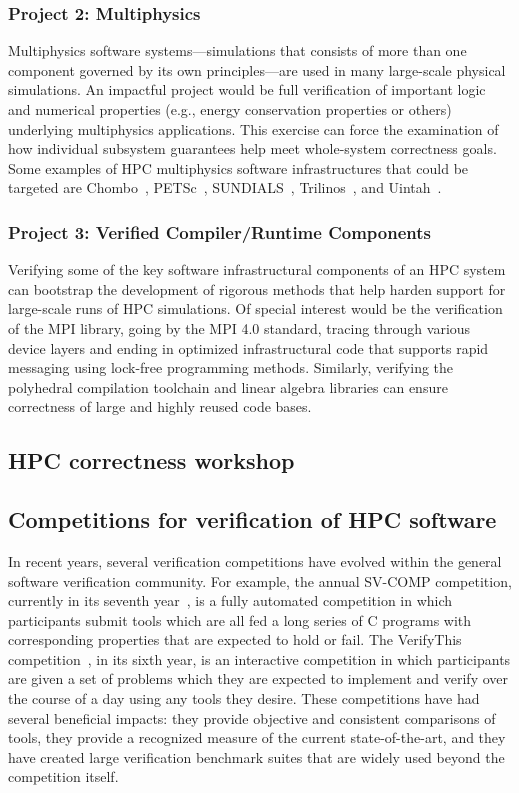 \subsubsection{Project 2: Multiphysics}
Multiphysics software systems---simulations that consists of more than
one component governed by its own principles---are used in many large-scale physical simulations.
%
An impactful project would be full verification of important logic and numerical properties (e.g., energy conservation properties or others) underlying multiphysics applications.
%
This exercise can force the examination of how individual subsystem guarantees help meet whole-system correctness goals.
%
Some examples of HPC multiphysics software infrastructures that could be targeted are Chombo~\cite{Chombo}, PETSc~\cite{PETSc}, SUNDIALS~\cite{SUNDIALS}, Trilinos~\cite{Trilinos}, and Uintah~\cite{Uintah}.

\subsubsection{Project 3: Verified Compiler/Runtime Components}
Verifying some of the key software infrastructural components of an HPC system can bootstrap the development of rigorous methods that help harden support for large-scale runs of HPC simulations.
%
Of special interest would be the verification of the MPI library, going by the MPI 4.0 standard, tracing through various device layers and ending in optimized infrastructural code that supports rapid messaging using lock-free programming methods.
%
Similarly, verifying the polyhedral compilation toolchain and linear algebra libraries can ensure correctness of large and highly reused code bases.


\subsection{HPC correctness workshop}


\subsection{Competitions for verification of HPC software}

In recent years, several verification competitions have evolved within the general software verification community.
For example, the annual SV-COMP competition, currently in its seventh year~\cite{sv-comp}, is a fully automated competition in which participants submit tools which are all fed a long series of C programs with corresponding properties that are expected to hold or fail.  The VerifyThis competition~\cite{verify-this}, in its sixth year, is an interactive competition in which participants are given a set of problems which they are expected to implement and verify over the course of a day using any tools they desire.
These competitions have had several beneficial impacts: they provide objective and consistent comparisons of tools, they provide a recognized measure of the current state-of-the-art, and they have created large verification benchmark suites that are widely used beyond the competition itself.

